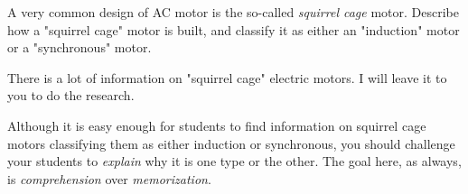 

A very common design of AC motor is the so-called {\it squirrel cage} motor.  Describe how a "squirrel cage" motor is built, and classify it as either an "induction" motor or a "synchronous" motor.







There is a lot of information on "squirrel cage" electric motors.  I will leave it to you to do the research.







Although it is easy enough for students to find information on squirrel cage motors classifying them as either induction or synchronous, you should challenge your students to {\it explain} why it is one type or the other.  The goal here, as always, is {\it comprehension} over {\it memorization}.




